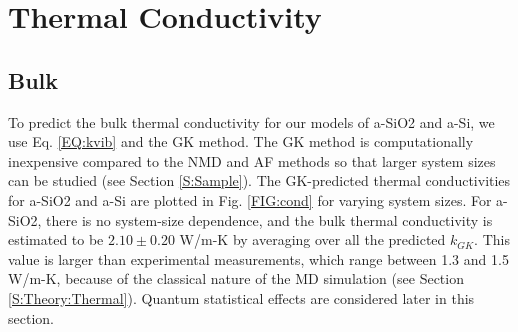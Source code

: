 \documentclass[aps,prb,onecolumn,preprint,superscriptaddress,footinbib,amsmath,amssymb,floatfix]{revtex4}
\begin{document}


\section{\label{S:Conductivity}Thermal Conductivity}

\subsection{\label{S:Bulk}Bulk}

To predict the bulk thermal conductivity for our models of a-SiO2 and 
a-Si, we use Eq. \eqref{EQ:kvib} 
and the GK method. The GK method is computationally 
inexpensive compared to the NMD and AF methods so that 
larger system sizes can be studied (see Section \ref{S:Sample}).  
The GK-predicted thermal conductivities for a-SiO2 and a-Si 
are plotted in Fig. \ref{FIG:cond} for 
varying system sizes. For a-SiO2, there is no system-size dependence, 
and the bulk thermal conductivity is estimated to be 
$2.10 \pm 0.20$ W/m-K by averaging over all the predicted $k_{GK}$. 
This value is larger than experimental measurements, which range between 
1.3\cite{cahill_lattice_1988,lee_heat_1997} 
and 1.5 W/m-K,\cite{yamane_measurement_2002,regner_broadband_2013} 
because of the classical 
nature of the MD simulation (see Section \ref{S:Theory:Thermal}). 
Quantum statistical effects are considered later in this section. 
\end{document}
